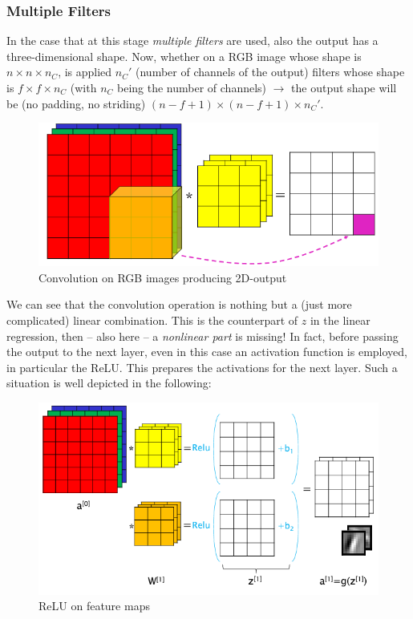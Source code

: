 \subsubsection{Multiple Filters}
In the case that at this stage \textit{multiple filters} are used, also the output has a three-dimensional shape.
Now, whether on a RGB image whose shape is ${n}\times{n}\times{n_C}$, is applied $n_C'$ (number of channels of the output) filters whose shape is ${f}\times{f}\times{n_C}$ (with $n_C$ being the number of channels) $\to$ the output shape will be (no padding, no striding) $(n-f+1)\times(n-f+1)\times{n_C'}$.\\

\begin{figure}[h]
    \centering
    \includegraphics[scale=0.6]{img/CNN_RGB.png}
    \caption{Convolution on RGB images producing 2D-output}
\end{figure}

We can see that the convolution operation is nothing but a (just more complicated) linear combination. This is the counterpart of $z$ in the linear regression, then -- also here -- a \textit{nonlinear part} is missing! In fact, before passing the output to the next layer, even in this case an activation function is employed, in particular the ReLU. This prepares the activations for the next layer. Such a situation is well depicted in the following:

\begin{figure}[h]
    \centering
    \includegraphics[scale=0.7]{img/ReLU_CNN.png}
    \caption{ReLU on feature maps}
\end{figure}

